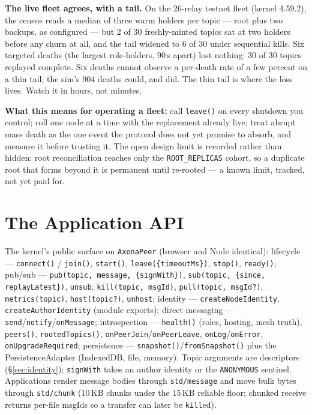 \documentclass[nobib]{tufte-handout}
\begin{document}
\textbf{The live fleet agrees, with a tail.} On the 26-relay testnet
fleet (kernel 4.59.2), the census reads a median of three warm holders
per topic --- root plus two backups, as configured --- but 2 of 30
freshly-minted topics sat at two holders before any churn at all, and
the tail widened to 6 of 30 under sequential kills. Six targeted
deaths (the largest role-holders, 90\,s apart) lost nothing: 30 of 30
topics replayed complete. Six deaths cannot observe a per-death rate
of a few percent on a thin tail; the sim's 904 deaths could, and did.
The thin tail is where the loss lives. Watch it in hours, not
minutes.

\textbf{What this means for operating a fleet:} call \texttt{leave()}
on every shutdown you control; roll one node at a time with the
replacement already live; treat abrupt mass death as the one event
the protocol does not yet promise to absorb, and measure it before
trusting it. The open design limit is recorded rather than hidden:
root reconciliation reaches only the \texttt{ROOT\_REPLICAS} cohort,
so a duplicate root that forms beyond it is permanent until re-rooted
--- a known limit, tracked, not yet paid for.

\section{The Application API}\label{sec:api}

The kernel's public surface on \texttt{AxonaPeer} (browser and Node
identical): lifecycle --- \texttt{connect()} / \texttt{join()},
\texttt{start()}, \texttt{leave(\{timeoutMs\})}, \texttt{stop()},
\texttt{ready()}; pub/sub --- \texttt{pub(topic, message,
\{signWith\})}, \texttt{sub(topic, \{since, replayLatest\})},
\texttt{unsub}, \texttt{kill(topic, msgId)}, \texttt{pull(topic,
msgId?)}, \texttt{metrics(topic)}, \texttt{host(topic?)},
\texttt{unhost}; identity --- \texttt{createNodeIdentity},
\texttt{createAuthorIdentity} (module exports); direct messaging ---
\texttt{send}/\texttt{notify}/\texttt{onMessage}; introspection ---
\texttt{health()} (roles, hosting, mesh truth), \texttt{peers()},
\texttt{rootedTopics()}, \texttt{onPeerJoin}/\texttt{onPeerLeave},
\texttt{onLog}/\texttt{onError}, \texttt{onUpgradeRequired};
persistence --- \texttt{snapshot()}/\texttt{fromSnapshot()} plus the
PersistenceAdapter (IndexedDB, file, memory). Topic arguments are
descriptors (\S\ref{sec:identity}); \texttt{signWith} takes an author
identity or the \texttt{ANONYMOUS} sentinel. Applications render
message bodies through \texttt{std/message} and move bulk bytes through
\texttt{std/chunk} (10\,KB chunks under the 15\,KB reliable floor;
chunked receive returns per-file msgIds so a transfer can later be
\texttt{kill}ed).
\end{document}
